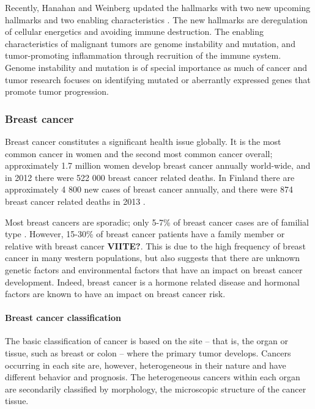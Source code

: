 Recently, Hanahan and Weinberg updated the hallmarks with two new upcoming
hallmarks and two enabling characteristics \citep{Hanahan2011}. The new
hallmarks are deregulation of cellular energetics and avoiding immune
destruction. The enabling characteristics of malignant tumors are genome
instability and mutation, and tumor-promoting inflammation through recruition
of the immune system. Genome instability and mutation is of special importance
as much of cancer and tumor research focuses  on identifying mutated or
aberrantly expressed genes that promote tumor progression.



\subsubsection{Breast cancer}\label{breast-cancer}

Breast cancer constitutes a significant health issue globally. It is the most
common cancer in women and the second most common cancer overall;
approximately 1.7 million women develop breast cancer annually world-wide, and
in 2012 there were 522 000 breast cancer related deaths.
\citep{Ferlay2015} In Finland there are approximately 4 800 new cases of
breast cancer annually, and there were 874 breast cancer related deaths in
2013 \citep{Syoparekisteri}.

Most breast cancers are sporadic; only 5-7\% of breast cancer cases are of
familial type \citep{Melchor2013}. However, 15-30\% of breast cancer patients
have a family member or relative with breast cancer \textbf{VIITE?}. This is due to the high
frequency of breast cancer in many western populations, but also suggests that
there are unknown genetic factors and environmental factors that have an
impact on breast cancer development.  Indeed, breast cancer is a hormone
related disease and hormonal factors are known to have an impact on
breast cancer risk.


\paragraph{Breast cancer classification}\label{breast-cancer-classification}

The basic classification of cancer is based on the site -- that is, the organ or
tissue, such as breast or colon -- where the primary tumor develops. Cancers
occurring in each site are, however, heterogeneous in their nature and have
different behavior and prognosis. The heterogeneous cancers
within each organ are secondarily classified by morphology, the microscopic structure of
the cancer tissue.

